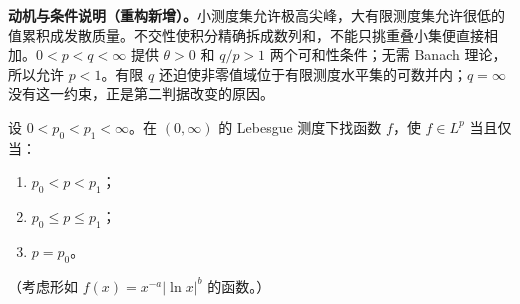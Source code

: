 \documentclass[../../main.tex]{subfiles}
\begin{document}
\begin{remark}
\textbf{动机与条件说明（重构新增）。}小测度集允许极高尖峰，大有限测度集允许很低的值累积成发散质量。不交性使积分精确拆成数列和，不能只挑重叠小集便直接相加。$0<p<q<\infty$ 提供 $\theta>0$ 和 $q/p>1$ 两个可和性条件；无需 Banach 理论，所以允许 $p<1$。有限 $q$ 还迫使非零值域位于有限测度水平集的可数并内；$q=\infty$ 没有这一约束，正是第二判据改变的原因。
\end{remark}
\begin{exercise}\label{exercise:ch06-integrability-intervals}
设 $0<p_0<p_1<\infty$。在 $(0,\infty)$ 的 Lebesgue 测度下找函数 $f$，使 $f\in L^p$ 当且仅当：
\begin{enumerate}
\item\label{item:ch06-integrability-open} $p_0<p<p_1$；
\item\label{item:ch06-integrability-closed} $p_0\leqslant p\leqslant p_1$；
\item\label{item:ch06-integrability-singleton} $p=p_0$。
\end{enumerate}
（考虑形如 $f(x)=x^{-a}|\ln x|^b$ 的函数。）
\end{exercise}
\end{document}
